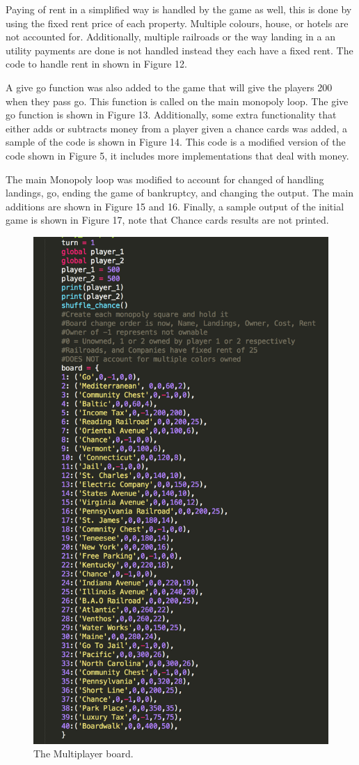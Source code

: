 \documentclass[12pt, letter]{article}
\begin{document}
Paying of rent in a simplified way is handled by the game as well, this is done by using the fixed rent price of each property. Multiple colours, house, or hotels are not accounted for. Additionally, multiple railroads or the way landing in a an utility payments are done is not handled instead they each have a fixed rent. The code to handle rent in shown in Figure 12. 

A give go function was also added to the game that will give the players 200 when they pass go. This function is called on the main monopoly loop. The give go function is shown in Figure 13. Additionally, some extra functionality that either adds or subtracts money from a player given a chance cards was added, a sample of the code is shown in Figure 14. This code is a modified version of the code shown in Figure 5, it includes more implementations that deal with money.  

The main Monopoly loop was modified to account for changed of handling landings, go, ending the game of bankruptcy, and changing the output. The main additions are shown in Figure 15 and 16. Finally, a sample output of the initial game is shown in Figure 17, note that Chance cards results are not printed.

 \begin{figure}[htb]
  \centering
  \includegraphics[width=0.7 \textwidth]{./figures/board_multiplayer.png}
  \caption{The Multiplayer board.}
\end{figure}
\end{document}
